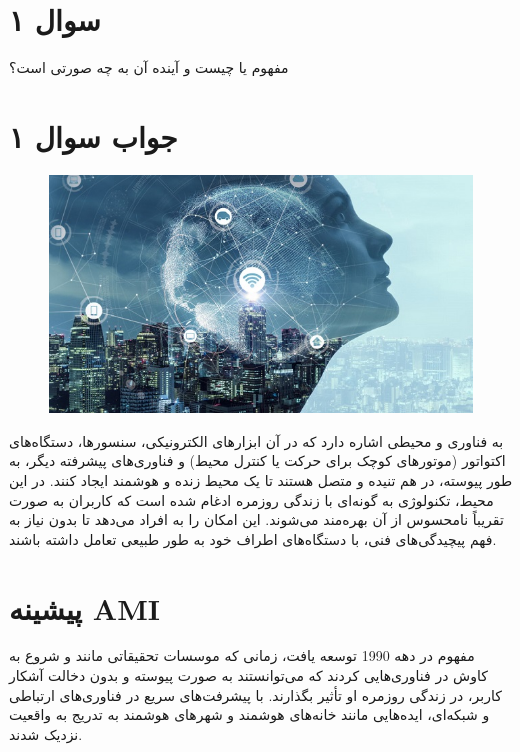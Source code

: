 \section*{سوال ۱}

مفهوم
یا
چیست و آینده آن به چه صورتی است؟

\section*{جواب سوال ۱}

\begin{figure}[H]
	\centering
	\includegraphics{pic1.jpg}
	\label{fig:label4}
\end{figure}

به فناوری و محیطی اشاره دارد که در آن ابزارهای الکترونیکی، سنسورها، دستگاه‌های اکتواتور (موتورهای کوچک برای حرکت یا کنترل محیط) و فناوری‌های پیشرفته دیگر، به طور پیوسته، در هم تنیده و متصل هستند تا یک محیط زنده و هوشمند ایجاد کنند. در این محیط، تکنولوژی به گونه‌ای با زندگی روزمره ادغام شده است که کاربران به صورت تقریباً نامحسوس از آن بهره‌مند می‌شوند. این امکان را به افراد می‌دهد تا بدون نیاز به فهم پیچیدگی‌های فنی، با دستگاه‌های اطراف خود به طور طبیعی تعامل داشته باشند.

\section*{پیشینه AMI}
مفهوم
در دهه 1990 توسعه یافت، زمانی که موسسات تحقیقاتی مانند
و
شروع به کاوش در فناوری‌هایی کردند که می‌توانستند به صورت پیوسته و بدون دخالت آشکار کاربر، در زندگی روزمره او تأثیر بگذارند. با پیشرفت‌های سریع در فناوری‌های ارتباطی و شبکه‌ای، ایده‌هایی مانند خانه‌های هوشمند و شهرهای هوشمند به تدریج به واقعیت نزدیک شدند.

